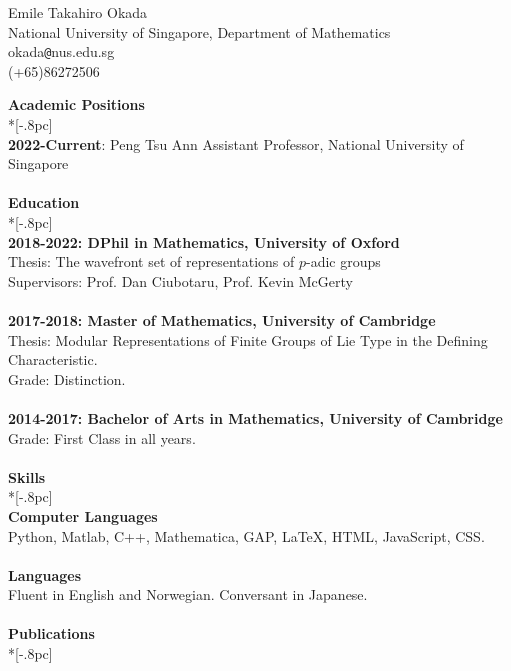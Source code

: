 \documentclass{article}
\begin{document}
\begin{center}
{\Large Emile Takahiro Okada} \\[.5pc]
National University of Singapore, Department of Mathematics \\
okada\verb|@|nus.edu.sg \\
(+65)86272506\\[5pc]
\end{center}

{\large \bf Academic Positions} \\*[-.8pc]
\underline{\hspace{1.7in}}
\\
 {\bf 2022-Current}: Peng Tsu Ann Assistant Professor, National University of Singapore \\
\\
{\large \bf Education} \\*[-.8pc]
\underline{\hspace{0.9in}}
\\
{\bf 2018-2022: DPhil in Mathematics, University of Oxford} \\
Thesis: The wavefront set of representations of $p$-adic groups \\
Supervisors: Prof. Dan Ciubotaru, Prof. Kevin McGerty\\
\\
{\bf 2017-2018: Master of Mathematics, University of Cambridge} \\
Thesis: Modular Representations of Finite Groups of Lie Type in the Defining Characteristic. \\
Grade: Distinction. \\
\\
{\bf 2014-2017: Bachelor of Arts in Mathematics, University of Cambridge} \\
Grade: First Class in all years. \\
\\
{\large \bf Skills} \\*[-.8pc]
\underline{\hspace{0.5in}} \\
{\bf Computer Languages} \\
Python, Matlab, C++, Mathematica, GAP, \LaTeX, HTML, JavaScript, CSS. \\
\\
{\bf Languages} \\
Fluent in English and Norwegian. Conversant in Japanese.
\\
\\
{\large \bf Publications} \\*[-.8pc]
\end{document}
